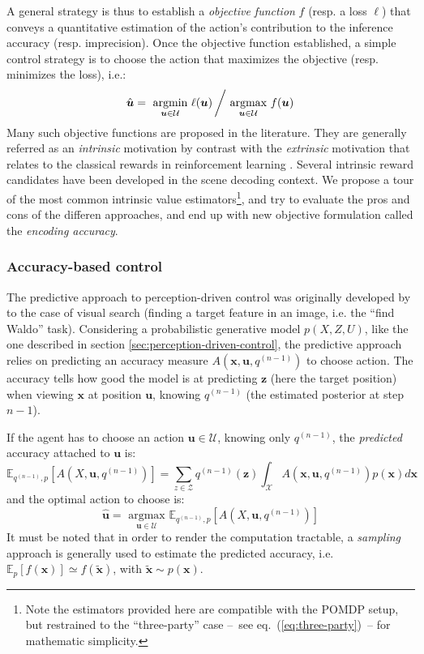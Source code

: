 \documentclass[12pt,twoside,openright]{article}
\begin{document}
A general strategy is thus to establish a \emph{objective function} $f$ (resp. a loss $\ell$) that conveys a quantitative estimation of the action's contribution to the inference accuracy (resp. imprecision). Once the objective function established, a simple control strategy is to choose the action that maximizes the objective (resp. minimizes the loss), i.e.:
\begin{align}
\hat{\boldsymbol{u}} = \underset{\boldsymbol{u}\in\mathcal{U}}{\text{ argmin }}  \ell(\boldsymbol{u})\left/ \underset{\boldsymbol{u}\in\mathcal{U}}{\text{ argmax }}  f(\boldsymbol{u})\right.
\end{align}
Many such objective functions are proposed in the literature. They are generally referred as an \emph{intrinsic} motivation \cite{oudeyer2008can} by contrast with the \emph{extrinsic} motivation that relates to the classical rewards in reinforcement learning \cite{sutton1998reinforcement}. Several intrinsic reward candidates have been developed in the scene decoding context.
We propose a tour of the most common intrinsic value estimators\footnote{Note the estimators provided here are compatible with the POMDP setup, but restrained to the ``three-party'' case --~see eq.~(\ref{eq:three-party})~-- for mathematic simplicity.}, and try to evaluate the pros and cons of the differen approaches, and end up with new objective formulation called the \emph{encoding accuracy}. 


\subsubsection{Accuracy-based control}\label{sec:infomax}


The predictive approach to perception-driven control was originally developed by \cite{najemnik2005optimal} to the case of visual search (finding a target feature in an image, i.e. the ``find Waldo'' task).
Considering a  probabilistic generative model $p(X,Z,U)$, like the one described in section \ref{sec:perception-driven-control}, the predictive approach relies on predicting an accuracy measure $A(\boldsymbol{x}, \boldsymbol{u}, q^{(n-1)})$ to choose action. 
The accuracy tells how good the model is at predicting $\boldsymbol{z}$ (here the target position) when viewing $\boldsymbol{x}$ at position $\boldsymbol{u}$,
knowing $q^{(n-1)}$ (the estimated posterior at step $n-1$).

If the agent has to choose an action $\boldsymbol{u} \in \mathcal{U}$, knowing only $q^{(n-1)}$, the \emph{predicted} accuracy attached to $\boldsymbol{u}$ is:
$$\mathbb{E}_{q^{(n-1)},p}\left[A(X, \boldsymbol{u}, q^{(n-1)})\right]  = \sum_{z\in\mathcal{Z}} q^{(n-1)}(\boldsymbol{z}) \int_{\mathcal{X}}  A(\boldsymbol{x}, \boldsymbol{u}, q^{(n-1)}) p(\boldsymbol{x}) d\boldsymbol{x} $$  
and the optimal action to choose is:
$$\hat{\boldsymbol{u}} = \underset{\boldsymbol{u} \in \mathcal{U}}{\text{ argmax }} \mathbb{E}_{q^{(n-1)},p}\left[A(X, \boldsymbol{u}, q^{(n-1)})\right] $$ 
It must be noted that in order to render the computation tractable, a \emph{sampling} approach is generally used to estimate the predicted accuracy, i.e. $\mathbb{E}_p[f(\boldsymbol{x})] \simeq f(\tilde{\boldsymbol{x}})$, with $\tilde{\boldsymbol{x}}\sim p(\boldsymbol{x})$.
\end{document}
